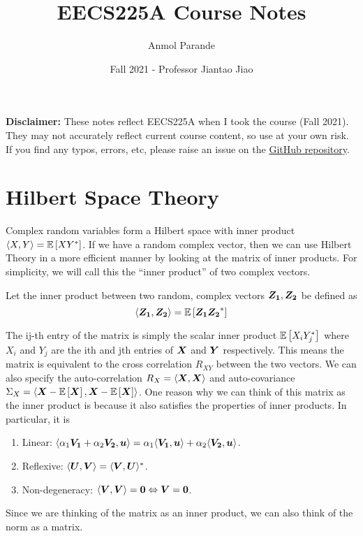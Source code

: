 

\title{EECS225A Course Notes}
\author{Anmol Parande}
\date{Fall 2021 - Professor Jiantao Jiao}
\maketitle
\textbf{Disclaimer: }These notes reflect EECS225A when I took the course (Fall 2021). They may not accurately reflect current course content, so use at your own risk.
If you find any typos, errors, etc, please raise an issue on the \href{https://github.com/parandea17/BerkeleyNotes}{GitHub repository}.
\tableofcontents
\newpage
\section{Hilbert Space Theory}
Complex random variables form a Hilbert space with inner product $\langle X, Y \rangle = \mathbb{E}\left[XY^*\right]$.
If we have a random complex vector, then we can use Hilbert Theory in a more efficient manner by looking at the matrix of inner products.
For simplicity, we will call this the ``inner product'' of two complex vectors.
\begin{definition}
	Let the inner product between two random, complex vectors $\boldsymbol{Z_1}, \boldsymbol{Z_2}$ be defined as \[
		\langle \boldsymbol{Z_1}, \boldsymbol{Z_2} \rangle = \mathbb{E}\left[\boldsymbol{Z_1}\boldsymbol{Z_2}^*\right]
	\]
	\label{defn:inner-product}
\end{definition}
The ij-th entry of the matrix is simply the scalar inner product $\mathbb{E}\left[X_iY_j^*\right]$ where $X_i$ and $Y_j$ are the ith and jth entries of $\boldsymbol{X}$ and $\boldsymbol{Y}$ respectively.
This means the matrix is equivalent to the cross correlation $R_{XY}$ between the two vectors.
We can also specify the auto-correlation $R_X = \langle \boldsymbol{X}, \boldsymbol{X} \rangle$ and auto-covariance $\Sigma_X = \langle \boldsymbol{X} - \mathbb{E}\left[\boldsymbol{X}\right], \boldsymbol{X} - \mathbb{E}\left[\boldsymbol{X}\right] \rangle$.
One reason why we can think of this matrix as the inner product is because it also satisfies the properties of inner products.
In particular, it is
\begin{enumerate}
	\item Linear: $\langle \alpha_1\boldsymbol{V_1}+\alpha_2\boldsymbol{V_2}, \boldsymbol{u} \rangle = \alpha_1\langle \boldsymbol{V_1}, \boldsymbol{u} \rangle + \alpha_2\langle \boldsymbol{V_2}, \boldsymbol{u} \rangle$.
	\item Reflexive: $\langle \boldsymbol{U}, \boldsymbol{V} \rangle = \langle \boldsymbol{V}, \boldsymbol{U} \rangle^*$.
	\item Non-degeneracy: $\langle \boldsymbol{V}, \boldsymbol{V} \rangle = \boldsymbol{0} \Leftrightarrow \boldsymbol{V} = \boldsymbol{0}$.
\end{enumerate}
Since we are thinking of the matrix as an inner product, we can also think of the norm as a matrix.
